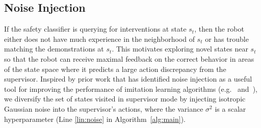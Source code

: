 
\subsection{Noise Injection}
\label{subsec:noise-inj}
If the safety classifier is querying for interventions at state $s_t$, then the robot either does not have much experience in the neighborhood of $s_t$ or has trouble matching the demonstrations at $s_t$. This motivates exploring novel states near $s_t$ so that the robot can receive maximal feedback on the correct behavior in areas of the state space where it predicts a large action discrepancy from the supervisor. Inspired by prior work that has identified noise injection as a useful tool for improving the performance of imitation learning algorithms (e.g.~\citet{DART} and~\citet{brown2019drex}), we diversify the set of states visited in supervisor mode by injecting isotropic Gaussian noise into the supervisor's actions, where the variance $\sigma^2$ is a scalar hyperparameter (Line \ref{lin:noise} in Algorithm~\ref{alg:main}).

